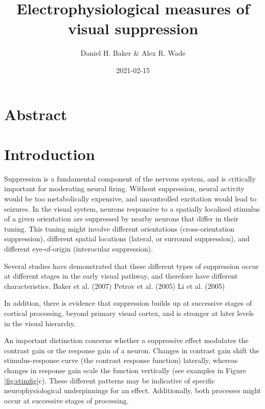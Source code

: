 \documentclass[]{article}
\title{Electrophysiological measures of visual suppression}
\author{Daniel H. Baker \& Alex R. Wade}
\date{2021-02-15}
\begin{document}
\maketitle

\hypertarget{abstract}{%
\section{Abstract}\label{abstract}}

\hypertarget{introduction}{%
\section{Introduction}\label{introduction}}

Suppression is a fundamental component of the nervous system, and is critically important for moderating neural firing. Without suppression, neural activity would be too metabolically expensive, and uncontrolled excitation would lead to seizures. In the visual system, neurons responsive to a spatially localised stimulus of a given orientation are suppressed by nearby neurons that differ in their tuning. This tuning might involve different orientations (cross-orientation suppression), different spatial locations (lateral, or surround suppression), and different eye-of-origin (interocular suppression).

Several studies have demonstrated that these different types of suppression occur at different stages in the early visual pathway, and therefore have different characteristics. Baker et al. (2007) Petrov et al. (2005) Li et al. (2005)

In addition, there is evidence that suppression builds up at successive stages of cortical processing, beyond primary visual cortex, and is stronger at later levels in the visual hierarchy.

An important distinction concerns whether a suppressive effect modulates the contrast gain or the response gain of a neuron. Changes in contrast gain shift the stimulus-response curve (the contrast response function) laterally, whereas changes in response gain scale the function vertically (see examples in Figure \ref{fig:stimfig}c). These different patterns may be indicative of specific neurophysiological underpinnings for an effect. Additionally, both processes might occur at successive stages of processing.
\end{document}
